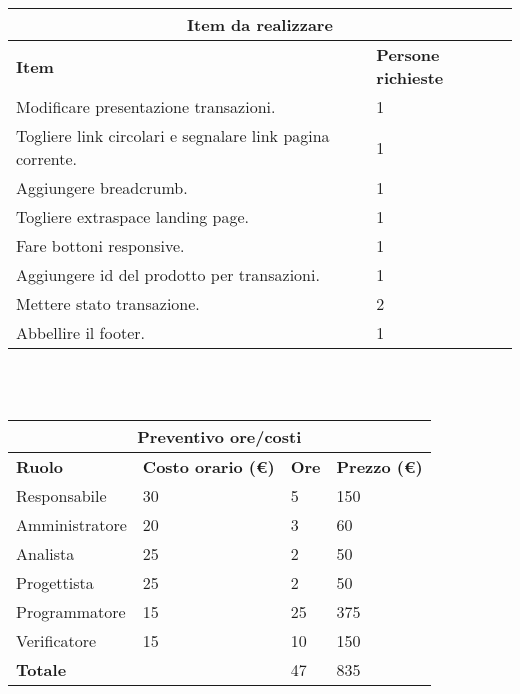 \documentclass[a4paper, 12pt]{article}
\begin{document}
\begin{center}
    \begin{tabularx}{\textwidth}{|X|X|}
        \hline
        \multicolumn{2}{|c|}{\textbf{Item da realizzare}}\\
        \hline
        \hline
        \textbf{Item} & \textbf{Persone richieste}\\
        \hline
        Modificare presentazione transazioni. & 1\\
		\hline
        Togliere link circolari e segnalare link pagina corrente. & 1\\
		\hline
        Aggiungere breadcrumb. & 1\\
		\hline
        Togliere extraspace landing page. & 1\\
		\hline
        Fare bottoni responsive. & 1\\
		\hline
        Aggiungere id del prodotto per transazioni. & 1\\
		\hline
        Mettere stato transazione. & 2\\
		\hline
        Abbellire il footer. & 1\\
		\hline
    \end{tabularx}\\[8pt]
    \mbox{}\\
\end{center}

\begin{center}
    \begin{tabularx}{\textwidth}{|X|X|X|X|}
        \hline
        \multicolumn{4}{|c|}{\textbf{Preventivo ore/costi}}\\
        \hline
        \hline
        \textbf{Ruolo} & \textbf{Costo orario (\euro)} & \textbf{Ore} & \textbf{Prezzo (\euro)}\\
        \hline
        Responsabile    & 30 & 5  & 150\\
        \hline
        Amministratore  & 20 & 3  & 60\\
        \hline
        Analista        & 25 & 2  & 50\\
        \hline
        Progettista     & 25 & 2  & 50\\
        \hline
        Programmatore   & 15 & 25  & 375\\
        \hline
        Verificatore    & 15 & 10  & 150\\
        \hline
        \hline
        \textbf{Totale} &    & 47 & 835\\
        \hline
    \end{tabularx}\\[8pt]
    \mbox{}\\
\end{center}
\end{document}
